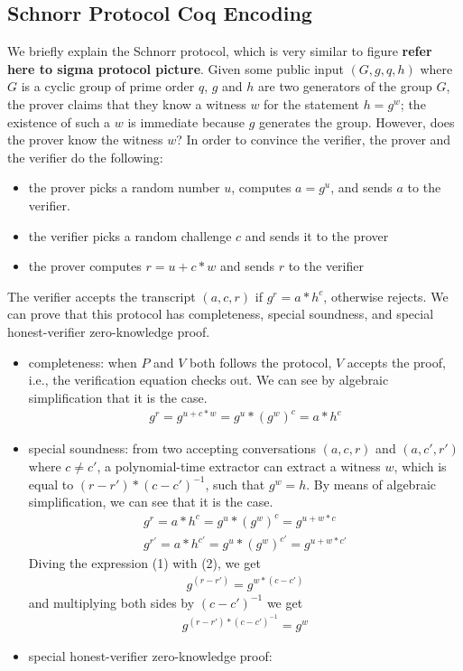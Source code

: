 \documentclass[conference,compsoc]{IEEEtran}
\begin{document}
\subsection{Schnorr Protocol Coq Encoding}

  We briefly explain the Schnorr protocol, which is very similar to figure \textbf{refer here to sigma protocol picture}.
  Given some public input $(G, g, q, h)$ where $G$
  is a cyclic group of prime order $q$, $g$ and $h$ are two 
  generators of the group $G$, the prover claims that they know a
  witness $w$ for the statement $h = g^w$; the existence of such
  a $w$ is immediate because $g$ generates the group. However,
  does the prover know the witness $w$? In order to convince the
  verifier, the prover and the verifier do the following:
  \begin{itemize}
    \item the prover picks a random number $u$, computes $a = g^u$,
    and sends $a$ to the verifier.
    \item the verifier picks a random challenge $c$ and sends it to
    the prover
    \item the prover computes $r = u + c * w$ and sends $r$ to the
    verifier
  \end{itemize}

The verifier accepts the transcript $(a, c, r)$ if $g^r = a * h^c$, otherwise rejects. We can prove that 
this protocol has completeness, special soundness, and special honest-verifier 
zero-knowledge proof. 


\begin{itemize}
  \item completeness: when $P$ and $V$ both follows the protocol, $V$ accepts the proof, i.e., 
  the verification equation checks out. We can see by algebraic simplification that it is the case.
    \begin{align*}
      g^r = g^{u + c * w} = g^u * (g^w)^c = a * h^c
    \end{align*}
  \item special soundness: from two accepting 
  conversations $(a, c, r)$ and $(a, c', r')$ where $c \neq c'$,
  a polynomial-time extractor can extract a witness $w$, 
  which is equal to $(r - r') * (c - c')^{-1}$, 
  such that $g^w = h$. By means of algebraic simplification, 
  we can see that it is the case.  
  \begin{align}
    g^r = a * h^c = g^u * (g^w)^c = g^{u + w * c}  \\
    g^{r'} = a * h^{c'} = g^u * (g^w)^{c'} = g^{u + w * c'}
  \end{align}
  Diving the expression (1) with (2), we get
  \begin{align*}
    g^{(r-r')} = g^{w * (c - c')}
  \end{align*}
  and multiplying both sides by $(c - c')^{-1}$ we 
  get 
  \begin{align*}
    g^{(r-r') * (c - c')^{-1}} = g^{w}
  \end{align*}

  \item special honest-verifier zero-knowledge proof:
  
   
\end{itemize}
\end{document}
